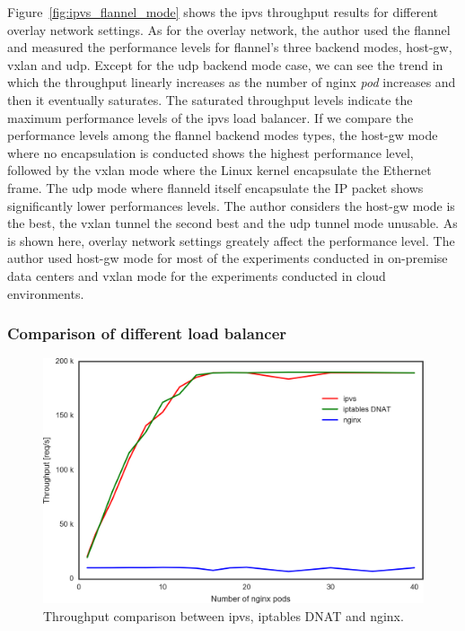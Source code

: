 Figure~\ref{fig:ipvs_flannel_mode} shows the ipvs throughput results for different overlay network settings.
As for the overlay network, the author used the flannel and measured the performance levels for flannel's three backend modes, host-gw, vxlan and udp.
Except for the udp backend mode case, we can see the trend in which the throughput linearly increases as the number of nginx {\em pod} increases and then it eventually saturates.
The saturated throughput levels indicate the maximum performance levels of the ipvs load balancer.
If we compare the performance levels among the flannel backend modes types, 
the host-gw mode where no encapsulation is conducted shows the highest performance level,
followed by the vxlan mode where the Linux kernel encapsulate the Ethernet frame.
The udp mode where flanneld itself encapsulate the IP packet shows significantly lower performances levels.
The author considers the host-gw mode is the best, the vxlan tunnel the second best and the udp tunnel mode unusable.
As is shown here, overlay network settings greately affect the performance level.
The author used host-gw mode for most of the experiments conducted in on-premise data centers and vxlan mode for the experiments conducted in cloud environments.  


\FloatBarrier

\subsubsection{Comparison of different load balancer}

\begin{figure}[htb]
  \centering
  \includegraphics[width=0.8\columnwidth]{Figs/ipvs-iptables-nginx}
  \caption{Throughput comparison between ipvs, iptables DNAT and nginx.}
  \label{fig:ipvs-iptables-nginx}
\end{figure}

